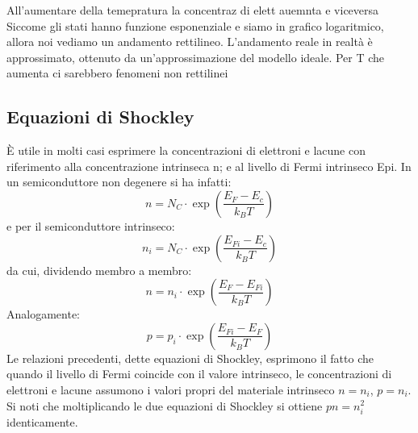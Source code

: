 All'aumentare della temepratura la concentraz di elett auemnta  e viceversa
Siccome gli stati hanno funzione esponenziale e siamo in grafico logaritmico, allora noi vediamo un andamento rettilineo.
L'andamento reale in realtà è approssimato, ottenuto da un'approssimazione del modello ideale.
Per T che aumenta ci sarebbero fenomeni non rettilinei 
%
\subsection{Equazioni di Shockley}
È utile in molti casi esprimere la concentrazioni di elettroni e lacune con riferimento alla concentrazione intrinseca n; e al livello di Fermi intrinseco Epi. In un
semiconduttore non degenere si ha infatti: 
%
\begin{equation}
    n=N_C \cdot \exp{\left( \dfrac{E_F-E_c}{k_B T}\right)}
\end{equation}
%
e per il semiconduttore intrinseco: 
%
\begin{equation}
    n_i=N_C \cdot \exp{\left( \dfrac{E_{Fi}-E_c}{k_B T}\right)}
\end{equation}
%
da cui, dividendo membro a membro: 
%
\begin{equation}
    n=n_i \cdot \exp{\left( \dfrac{E_{F}-E_{Fi}}{k_B T}\right)}
\end{equation}
%
Analogamente:
%
\begin{equation}
    p = p_i \cdot \exp{\left( \dfrac{E_{Fi}-E_{F}}{k_B T}\right)}
\end{equation}
%
Le relazioni precedenti, dette equazioni di Shockley, esprimono il fatto che quando
il livello di Fermi coincide con il valore intrinseco, le concentrazioni di elettroni e
lacune assumono i valori propri del materiale intrinseco $n = n_i$, $p = n_i$. Si noti
che moltiplicando le due equazioni di Shockley si ottiene $pn = n_i^2$ identicamente.
%
